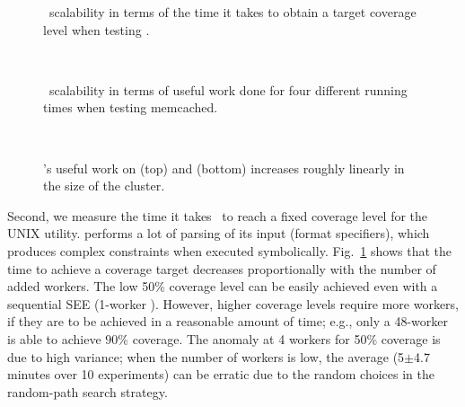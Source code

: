 \begin{figure}[h!]
  \centering
  \caption{\cnine\ scalability in terms of the time it takes to obtain a target coverage level when testing .}
  \label{fig:scalab-time-vs-workers-cov}
\end{figure}

\begin{figure}[t!]
  \centering
   \\
  \caption{\cnine\ scalability in terms of useful work done for four different running times when testing memcached.}
  \label{fig:scalab-memcached}
\end{figure}

\begin{figure}[h!]
  \centering
   \\
  \caption{\cnine's useful work on  (top) and  (bottom) increases roughly linearly in the size of the cluster.}  
  \label{fig:scalab}
\end{figure}

Second, we measure the time it takes \cnine\ to reach a fixed coverage level for the  UNIX utility.   performs a lot of parsing of its input (format specifiers), which produces complex constraints when executed symbolically.   Fig.~\ref{fig:scalab-time-vs-workers-cov} shows that the time to achieve a coverage target decreases proportionally with the number of added workers.  The low 50\% coverage level can be easily achieved even with a sequential SEE (1-worker \cnine). However, higher coverage levels require more workers, if they are to be achieved in a reasonable amount of time; e.g., only a 48-worker \cnine is able to achieve  $90\%$ coverage.  The anomaly at 4 workers for 50\% coverage is due to high variance; when the number of workers is low, the average (5$\pm$4.7 minutes over 10 experiments) can be erratic due to the random choices in the random-path search strategy.

